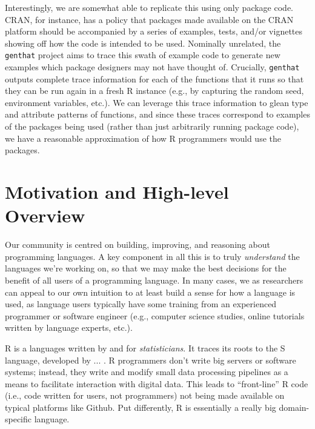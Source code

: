 \documentclass[acmsmall,10pt,review,anonymous]{acmart}\settopmatter{printfolios=true,printccs=false,printacmref=false}
\begin{document}
Interestingly, we are somewhat able to replicate this using only package code.
CRAN, for instance, has a policy that packages made available on the CRAN platform should be accompanied by a series of examples, tests, and/or vignettes showing off how the code is intended to be used.
Nominally unrelated, the {\tt genthat} project aims to trace this swath of example code to generate new examples which package designers may not have thought of.
Crucially, {\tt genthat} outputs complete trace information for each of the functions that it runs so that they can be run again in a fresh R instance (e.g., by capturing the random seed, environment variables, etc.).
We can leverage this trace information to glean type and attribute patterns of functions, and since these traces correspond to examples of the packages being used (rather than just arbitrarily running package code), we have a reasonable approximation of how R programmers would use the packages.




%
%
%
%
%
%
\section{Motivation and High-level Overview}

Our community is centred on building, improving, and reasoning about
programming languages.  A key component in all this is to truly
\textit{understand} the languages we're working on, so that we may make the
best decisions for the benefit of all users of a programming language.  In
many cases, we as researchers can appeal to our own intuition to at least
build a sense for how a language is used, as language users typically have
some training from an experienced programmer or software engineer (e.g.,
computer science studies, online tutorials written by language experts,
etc.).  

R is a languages written by and for \textit{statisticians}.  It traces its
roots to the S language, developed by ... .  R programmers don't write big
servers or software systems; instead, they write and modify small data
processing pipelines as a means to facilitate interaction with digital data.
This leads to ``front-line'' R code (i.e., code written for users, not
programmers) not being made available on typical platforms like Github.
  Put differently, R is essentially a really big
domain-specific language.
\end{document}
